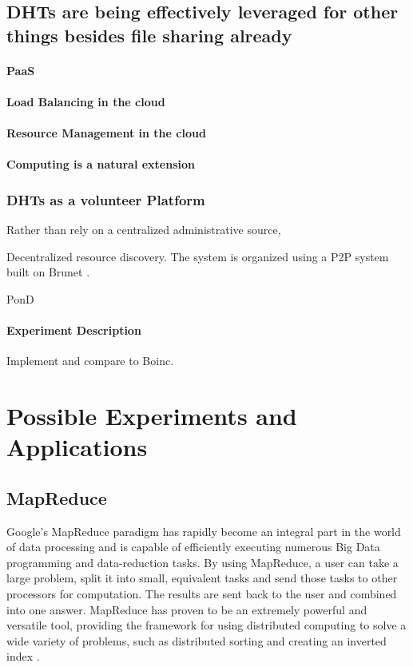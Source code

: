 \documentclass[10pt,letterpaper]{report}
\begin{document}
\section{DHTs are being effectively leveraged for other things besides file sharing already}

\subsubsection{PaaS}
\subsubsection{Load Balancing in the cloud}
\subsubsection{Resource Management in the cloud}
\subsubsection{Computing is a natural extension}

\subsection{DHTs as a volunteer Platform}
Rather than rely on a centralized administrative source,


Decentralized resource discovery.
The system is organized using a P2P system built on Brunet \cite{brunet}.



PonD \cite{leepond}
\subsubsection{Experiment Description}
Implement and compare to Boinc.



\chapter{Possible Experiments and Applications}


\section{MapReduce}

Google's MapReduce \cite{mapreduce} paradigm has rapidly become an integral part in the world of data processing and is capable of efficiently executing numerous Big Data programming and data-reduction tasks.  
By using MapReduce, a user can take a large problem, split it into small, equivalent tasks and send those tasks to other processors for computation.  
The results are sent back to the user and combined into one answer.  
MapReduce has proven to be an extremely powerful and versatile tool, providing the framework for using distributed computing to solve a wide variety of problems, such as distributed sorting and creating an inverted index \cite{mapreduce}. 
\end{document}
